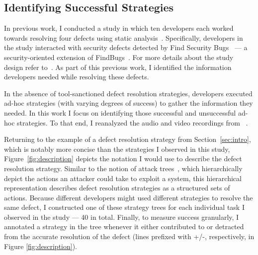 \documentclass{sig-alternate}
\begin{document}

%

\subsection{Identifying Successful Strategies}
In previous work, I conducted a study in which ten developers each worked towards resolving four defects using static analysis~\cite{Smith2015}.
Specifically, developers in the study interacted with security defects detected by Find Security Bugs~\cite{FindSecurityBugs} --- a security-oriented extension of FindBugs~\cite{FindBugs}.
For more details about the study design refer to~\cite{Smith2015}. 
As part of this previous work, I identified the information developers needed while resolving these defects.

In the absence of tool-sanctioned defect resolution strategies, developers executed ad-hoc strategies (with varying degrees of success) to gather the information they needed.
In this work I focus on identifying those successful and unsuccessful ad-hoc strategies.
To that end, I reanalyzed the audio and video recordings from ~\cite{Smith2015}. 

Returning to the example of a defect resolution strategy from Section~\ref{sec:intro}, which is notably more concise than the strategies I observed in this study, Figure~\ref{fig:description} depicts the notation I would use to describe the defect resolution strategy. 
Similar to the notion of attack trees~\cite{attackTrees}, which hierarchically depict the actions an attacker could take to exploit a system, this hierarchical representation describes defect resolution strategies as a structured sets of actions.
Because different developers might used different strategies to resolve the same defect, I constructed one of these strategy trees for each individual task I observed in the study --- 40 in total.
Finally, to measure success granularly, I annotated a strategy in the tree whenever it either contributed to or detracted from the accurate resolution of the defect (lines prefixed with +/-, respectively, in Figure \ref{fig:description}).
\end{document}
